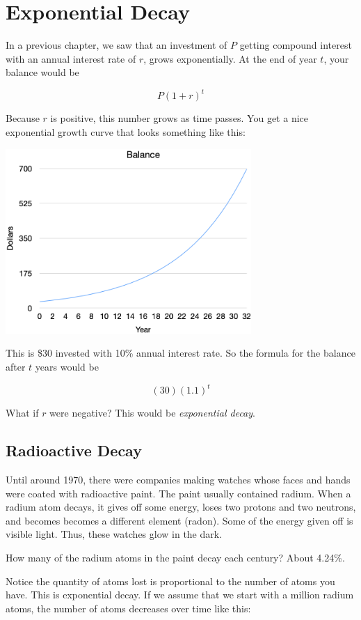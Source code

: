 \chapter{Exponential Decay}

In a previous chapter, we saw that an investment of $P$ getting
compound interest with an annual interest rate of $r$, grows
exponentially. At the end of year $t$, your balance would be

$$P\left(1 + r\right)^t$$

Because $r$ is positive, this number grows as time passes.  You get a
nice exponential growth curve that looks something like this:

\includegraphics[width=0.7\textwidth]{exponential_growth.png}

This is \$30 invested with 10\% annual interest rate. So the formula
for the balance after $t$ years would be

$$(30)(1.1)^t$$

What if $r$ were negative? This would be \textit{exponential decay}.

\section{Radioactive Decay}

Until around 1970, there were companies making watches whose faces and
hands were coated with radioactive paint. The paint usually contained
radium. When a radium atom decays, it gives off some energy, loses two
protons and two neutrons, and becomes becomes a different element
(radon). Some of the energy given off is visible light. Thus, these
watches glow in the dark.

How many of the radium atoms in the paint decay each century? About 4.24\%.

Notice the quantity of atoms lost is proportional to the number of
atoms you have. This is exponential decay. If we assume that we start
with a million radium atoms, the number of atoms decreases over time like this:


